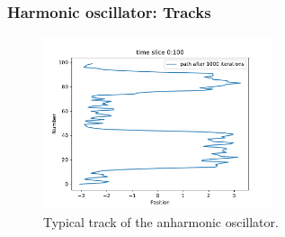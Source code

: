 \documentclass[aspectratio=169]{beamer}
\begin{document}
\begin{frame}
	\frametitle{Harmonic oscillator: Tracks}
	\vspace{-15px}
	\begin{figure}[H]
		\centering
			\includegraphics[width=0.6\textwidth]{../imgs/anharmonic_oscillator_track/track_100010005_track_pretty_1000.pdf}
		\caption{Typical track of the anharmonic oscillator.}
		\label{fig:anharmonic_oscillator_track_100010005_track_pretty_1000}
	\end{figure}
\end{frame}
\end{document}
